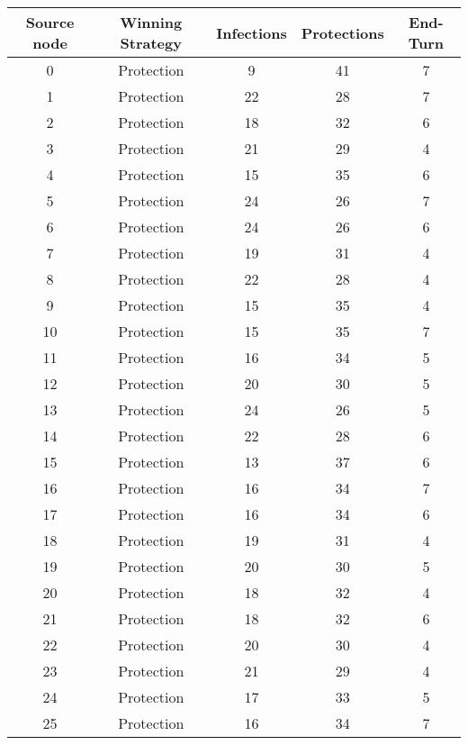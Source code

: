 \documentclass[results.tex]{subfiles}
\begin{document}
\begin{center}
  \begin{tabular}{| c || c | c | c | c |}
    \hline
    {\bfseries Source node} & {\bfseries Winning Strategy} & {\bfseries Infections} & {\bfseries Protections} & {\bfseries End-Turn} \\  %
    \hline\hline
    0 & Protection & 9 & 41 & 7 \\ 
    \hline
    1 & Protection & 22 & 28 & 7 \\ 
    \hline
    2 & Protection & 18 & 32 & 6 \\ 
    \hline
    3 & Protection & 21 & 29 & 4 \\ 
    \hline
    4 & Protection & 15 & 35 & 6 \\ 
    \hline
    5 & Protection & 24 & 26 & 7 \\ 
    \hline
    6 & Protection & 24 & 26 & 6 \\ 
    \hline
    7 & Protection & 19 & 31 & 4 \\ 
    \hline
    8 & Protection & 22 & 28 & 4 \\ 
    \hline
    9 & Protection & 15 & 35 & 4 \\ 
    \hline
    10 & Protection & 15 & 35 & 7 \\ 
    \hline
    11 & Protection & 16 & 34 & 5 \\ 
    \hline
    12 & Protection & 20 & 30 & 5 \\ 
    \hline
    13 & Protection & 24 & 26 & 5 \\ 
    \hline
    14 & Protection & 22 & 28 & 6 \\ 
    \hline
    15 & Protection & 13 & 37 & 6 \\ 
    \hline
    16 & Protection & 16 & 34 & 7 \\ 
    \hline
    17 & Protection & 16 & 34 & 6 \\ 
    \hline
    18 & Protection & 19 & 31 & 4 \\ 
    \hline
    19 & Protection & 20 & 30 & 5 \\ 
    \hline
    20 & Protection & 18 & 32 & 4 \\ 
    \hline
    21 & Protection & 18 & 32 & 6 \\ 
    \hline
    22 & Protection & 20 & 30 & 4 \\ 
    \hline
    23 & Protection & 21 & 29 & 4 \\ 
    \hline
    24 & Protection & 17 & 33 & 5 \\ 
    \hline
    25 & Protection & 16 & 34 & 7 \\ 

\end{tabular}
\end{center}
\end{document}
